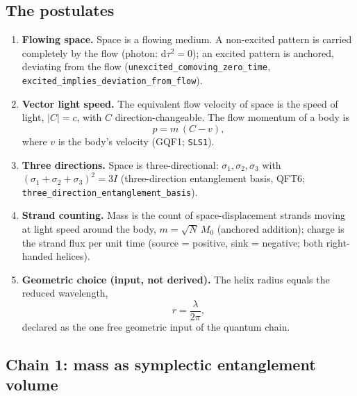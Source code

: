 \documentclass[aps,prd,preprint,superscriptaddress,amsmath,amssymb]{revtex4-2}
\begin{document}
\subsection{The postulates}
\label{app:postulates}

\begin{enumerate}
\item \textbf{Flowing space.} Space is a flowing medium.  A non-excited
pattern is carried completely by the flow (photon: $\mathrm d\tau^2=0$);
an excited pattern is anchored, deviating from the flow
(\texttt{unexcited\_comoving\_zero\_time}, \texttt{excited\_implies\_deviation\_from\_flow}).
\item \textbf{Vector light speed.} The equivalent flow velocity of space
is the speed of light, $|C|=c$, with $C$ direction-changeable.  The flow
momentum of a body is
\begin{equation}
p = m\,(C-v),
\label{eq:flowmomentum}
\end{equation}
where $v$ is the body's velocity (GQF1; \texttt{SLS1}).
\item \textbf{Three directions.} Space is three-directional:
$\sigma_1,\sigma_2,\sigma_3$ with
$(\sigma_1+\sigma_2+\sigma_3)^2=3I$ (three-direction entanglement basis,
QFT6; \texttt{three\_direction\_entanglement\_basis}).
\item \textbf{Strand counting.} Mass is the count of space-displacement
strands moving at light speed around the body, $m=\sqrt N\,M_0$
(anchored addition); charge is the strand flux per unit time (source =
positive, sink = negative; both right-handed helices).
\item \textbf{Geometric choice (input, not derived).} The helix radius
equals the reduced wavelength,
\begin{equation}
r = \frac{\lambda}{2\pi},
\label{eq:rchoice}
\end{equation}
declared as the one free geometric input of the quantum chain.
\end{enumerate}

\subsection{Chain 1: mass as symplectic entanglement volume}
\label{app:chain1}
\end{document}
